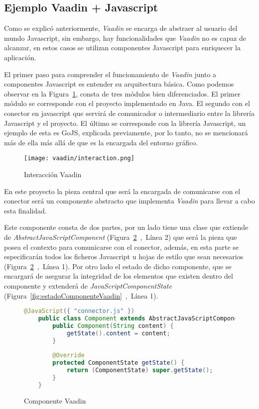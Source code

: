 \subsection{Ejemplo Vaadin + Javascript}

Como se explicó anteriormente, \emph{Vaadin} se encarga de abstraer al usuario del mundo Javascript, sin embargo, hay funcionalidades que \emph{Vaadin} no es capaz de alcanzar, en estos casos se utilizan componentes Javascript para enriquecer la aplicación.

El primer paso para comprender el funcionamiento de \emph{Vaadin} junto a componentes Javascript es entender su arquitectura básica. Como podemos observar en la Figura~\ref{fig:interaction}, consta de tres módulos bien diferenciados. El primer módulo se corresponde con el proyecto implementado en Java. El segundo con el conector en javascript que servirá de comunicador o intermediario entre la librería Javascript y el proyecto. El último se corresponde con la librería Javascript, un ejemplo de esta es GoJS, explicada previamente, por lo tanto, no se mencionará más de ella más allá de que es la encargada del entorno gráfico.



\begin{figure}[!tb]
	\centering
	\texttt{[image: vaadin/interaction.png]}
	\caption{Interacción Vaadin}\label{fig:interaction}
\end{figure}




En este proyecto la pieza central que será la encargada de comunicarse con el conector será un componente abstracto que implementa \emph{Vaadin} para llevar a cabo esta finalidad.

Este componente consta de dos partes, por un lado tiene una clase que extiende de \emph{AbstractJavaScriptComponent} (Figura~\ref{fig:componenteVaadin}~,~Línea 2) que será la pieza que posea el contexto para comunicarse con el conector, además, en esta parte se especificarán todos los ficheros Javascript u hojas de estilo que sean necesarios (Figura~\ref{fig:componenteVaadin}~,~Línea 1). Por otro lado el estado de dicho componente, que se encargará de asegurar la integridad de los elementos que existen dentro del componente y extenderá de \emph{JavaScriptComponentState} (Figura~\ref{fig:estadoComponenteVaadin}~,~Línea 1).

\begin{figure}[!tb]
	\centering
	\begin{lstlisting}[language=Java]
	@JavaScript({ "connector.js" })
	public class Component extends AbstractJavaScriptComponent {
		public Component(String content) {
			getState().content = content;
		}
		
		@Override
		protected ComponentState getState() {
			return (ComponentState) super.getState();
		}
	}\end{lstlisting}
	\caption{Componente Vaadin}
	\label{fig:componenteVaadin}
\end{figure}


